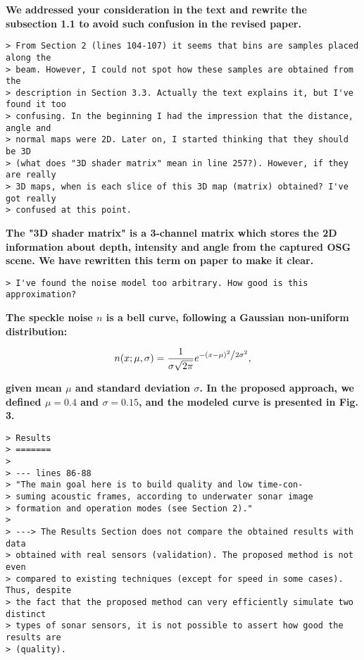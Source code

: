 \documentclass{article}
\begin{document}
\textbf{We addressed your consideration in the text and rewrite the
subsection 1.1 to avoid such confusion in the revised paper.}

\begin{verbatim}
> From Section 2 (lines 104-107) it seems that bins are samples placed along the
> beam. However, I could not spot how these samples are obtained from the
> description in Section 3.3. Actually the text explains it, but I've found it too
> confusing. In the beginning I had the impression that the distance, angle and
> normal maps were 2D. Later on, I started thinking that they should be 3D
> (what does "3D shader matrix" mean in line 257?). However, if they are really
> 3D maps, when is each slice of this 3D map (matrix) obtained? I've got really
> confused at this point.
\end{verbatim}

\textbf{The "3D shader matrix" is a 3-channel matrix which stores the 2D information
about depth, intensity and angle from the captured OSG scene. We have rewritten this
term on paper to make it clear.}

\begin{verbatim}
> I've found the noise model too arbitrary. How good is this approximation?
\end{verbatim}

\textbf{The speckle noise $n$ is a bell curve, following a Gaussian non-uniform
distribution:}

\begin{equation*}
n(x;\mu,\sigma) = \frac{1}{{\sigma \sqrt {2\pi } }}e^{{{ - \left( {x - \mu } \right)^2 } \mathord{\left/ {\vphantom {{ - \left( {x - \mu } \right)^2 } {2\sigma ^2 }}} \right. \kern-\nulldelimiterspace} {2\sigma ^2 }}},
\end{equation*}

\textbf{given mean $\mu$ and standard deviation $\sigma$. In the proposed approach,
we defined $\mu = 0.4$ and $\sigma = 0.15$, and the modeled curve is presented in Fig. 3.}

\begin{verbatim}
> Results
> =======
>
> --- lines 86-88
> "The main goal here is to build quality and low time-con-
> suming acoustic frames, according to underwater sonar image
> formation and operation modes (see Section 2)."
>
> ---> The Results Section does not compare the obtained results with data
> obtained with real sensors (validation). The proposed method is not even
> compared to existing techniques (except for speed in some cases). Thus, despite
> the fact that the proposed method can very efficiently simulate two distinct
> types of sonar sensors, it is not possible to assert how good the results are
> (quality).
\end{verbatim}
\end{document}
